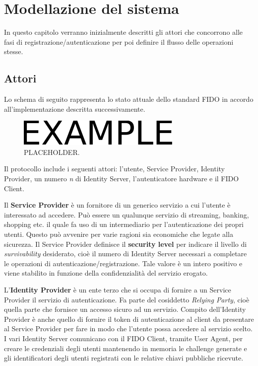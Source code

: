 \chapter{Modellazione del sistema}
\label{modellazione}

In questo capitolo verranno inizialmente descritti gli attori che concorrono alle fasi di registrazione/autenticazione per poi definire il flusso delle operazioni stesse.

\section{Attori}
\label{attori}

Lo schema di seguito rappresenta lo stato attuale dello standard FIDO in accordo all'implementazione descritta successivamente.
\begin{figure}[htb]
	\centering
	\includegraphics[width=.4\columnwidth]{figures/example.pdf}
	\caption{PLACEHOLDER.}
	\label{fig:esempio}
\end{figure}

Il protocollo include i seguenti attori: l'utente, Service Provider, Identity Provider, un numero \emph{n} di Identity Server, l'autenticatore hardware e il FIDO Client. 

Il \textbf{Service Provider} è un fornitore di un generico servizio a cui l'utente è interessato ad accedere. Può essere un qualunque servizio di streaming, banking, shopping etc. il quale fa uso di un intermediario per l'autenticazione dei propri utenti. Questo può avvenire per varie ragioni sia economiche che legate alla sicurezza. 
Il Service Provider definisce il \textbf{security level} per indicare il livello di \emph{survivability} desiderato, cioè il numero di Identity Server necessari a completare le operazioni di autenticazione/registrazione. Tale valore è un intero positivo e viene stabilito in funzione della confidenzialità del servizio erogato.

L'\textbf{Identity Provider} è un ente terzo che si occupa di fornire a un Service Provider il servizio di autenticazione. Fa parte del cosiddetto \emph{Relying Party}, cioè quella parte che fornisce un accesso sicuro ad un servizio. 
Compito dell'Identity Provider è anche quello di fornire il token di autenticazione al client da presentare al Service Provider per fare in modo che l'utente possa accedere al servizio scelto.
I vari Identity Server comunicano con il FIDO Client, tramite User Agent, per creare le credenziali degli utenti mantenendo in memoria le challenge generate e gli identificatori degli utenti registrati con le relative chiavi pubbliche ricevute. 

